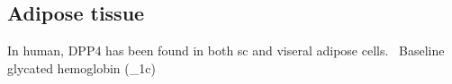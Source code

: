 \subsection{Adipose tissue}
In human, DPP4 has been found in both sc and viseral adipose cells.~\cite{Lamers2011} Baseline glycated hemoglobin (\HbA_{1c}) 